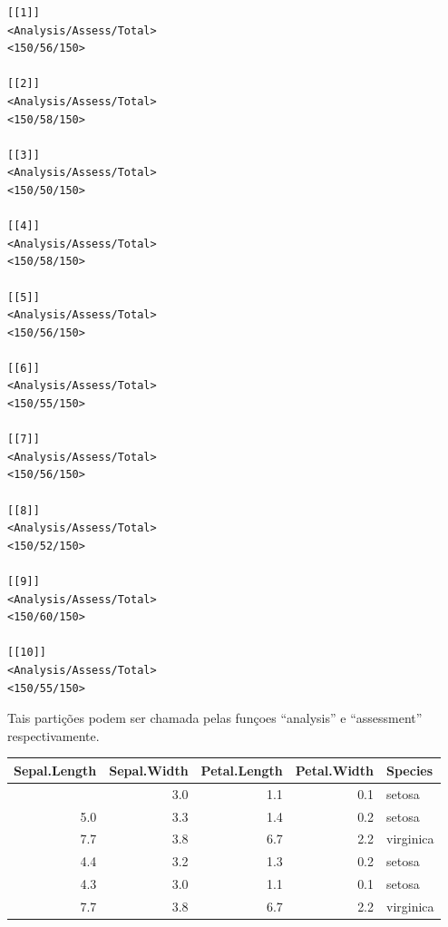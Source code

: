 \documentclass[
  a4paperpaper,
]{article}
\newenvironment{Shaded}{\begin{snugshade}}{\end{snugshade}}
\newcommand{\DecValTok}[1]{\textcolor[rgb]{0.68,0.00,0.00}{#1}}
\newcommand{\FunctionTok}[1]{\textcolor[rgb]{0.28,0.35,0.67}{#1}}
\newcommand{\NormalTok}[1]{\textcolor[rgb]{0.00,0.23,0.31}{#1}}
\newcommand{\SpecialCharTok}[1]{\textcolor[rgb]{0.37,0.37,0.37}{#1}}
\begin{document}
\begin{Shaded}
\end{Shaded}

\begin{verbatim}
[[1]]
<Analysis/Assess/Total>
<150/56/150>

[[2]]
<Analysis/Assess/Total>
<150/58/150>

[[3]]
<Analysis/Assess/Total>
<150/50/150>

[[4]]
<Analysis/Assess/Total>
<150/58/150>

[[5]]
<Analysis/Assess/Total>
<150/56/150>

[[6]]
<Analysis/Assess/Total>
<150/55/150>

[[7]]
<Analysis/Assess/Total>
<150/56/150>

[[8]]
<Analysis/Assess/Total>
<150/52/150>

[[9]]
<Analysis/Assess/Total>
<150/60/150>

[[10]]
<Analysis/Assess/Total>
<150/55/150>
\end{verbatim}

Tais partições podem ser chamada pelas funçoes ``analysis'' e
``assessment'' respectivamente.

\begin{Shaded}
\end{Shaded}

\begin{longtable}[]{@{}rrrrl@{}}
\toprule\noalign{}
Sepal.Length & Sepal.Width & Petal.Length & Petal.Width & Species \\
\midrule\noalign{}
\endhead
\bottomrule\noalign{}
\endlastfoot
4.3 & 3.0 & 1.1 & 0.1 & setosa \\
5.0 & 3.3 & 1.4 & 0.2 & setosa \\
7.7 & 3.8 & 6.7 & 2.2 & virginica \\
4.4 & 3.2 & 1.3 & 0.2 & setosa \\
4.3 & 3.0 & 1.1 & 0.1 & setosa \\
7.7 & 3.8 & 6.7 & 2.2 & virginica \\
\end{longtable}
\end{document}
